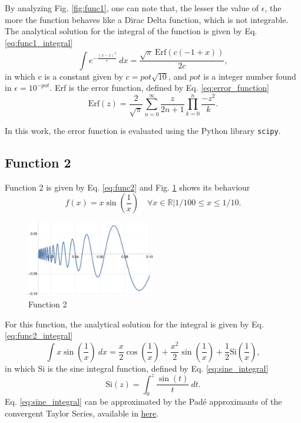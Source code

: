 By analyzing Fig. \ref{fig:func1}, one can note that, the lesser the value of $\epsilon$, the more the function behaves like a Dirac Delta function, which is not integrable. The analytical solution for the integral of the function is given by Eq. \eqref{eq:func1_integral}
\begin{equation}
    \label{eq:func1_integral}
    \int e^{-\frac{(x-1)^2}{\epsilon}} ~dx= \frac{\sqrt{\pi} ~\text{Erf}\left(c (- 1 + x)\right)}{2 c},
\end{equation}
in which c is a constant given by $c = pot\sqrt{10}$, and $pot$ is a integer number found in $\epsilon = 10^{-pot}$. Erf is the error function, defined by Eq. \eqref{eq:error_function}
\begin{equation}
    \label{eq:error_function}
    \text{Erf}(z) = \frac{2}{\sqrt{\pi}} \sum_{n=0}^{\infty} \frac{z}{2n + 1} \prod_{k=0}^{n} \frac{-z^2}{k}.
\end{equation}

In this work, the error function is evaluated using the Python library \texttt{scipy}.
\subsection{Function 2}
Function 2 is given by Eq. \eqref{eq:func2} and Fig. \ref{fig:func2} shows its behaviour
\begin{equation}
    \label{eq:func2}
    f(x) = x\sin(\frac{1}{x}) \quad \forall x \in \mathbb{R} | 1/100 \leq x \leq 1/10.
\end{equation}
\begin{figure}[H]
    \centering
    \includegraphics[width=0.5\textwidth]{../Figures/func2.pdf}
    \caption{Function 2}
    \label{fig:func2}
\end{figure}

For this function, the analytical solution for the integral is given by Eq. \eqref{eq:func2_integral}
\begin{equation}
    \label{eq:func2_integral}
    \int x\sin\left(\frac{1}{x}\right) ~dx = \frac{x}{2}\cos\left(\frac{1}{x}\right) + \frac{x^2}{2}\sin\left(\frac{1}{x}\right) + \frac{1}{2}\text{Si}\left(\frac{1}{x}\right),
\end{equation}
in which Si is the sine integral function, defined by Eq. \eqref{eq:sine_integral}
\begin{equation}
    \label{eq:sine_integral}
    \text{Si}(z) = \int_{0}^{z} \frac{\sin(t)}{t} ~dt.
\end{equation}
Eq. \eqref{eq:sine_integral} can be approximated by the Pad\'e approximants of the convergent Taylor Series, available in \href{https://en.wikipedia.org/wiki/Trigonometric_integral#Asymptotic_series_(for_large_argument)}{here}.

